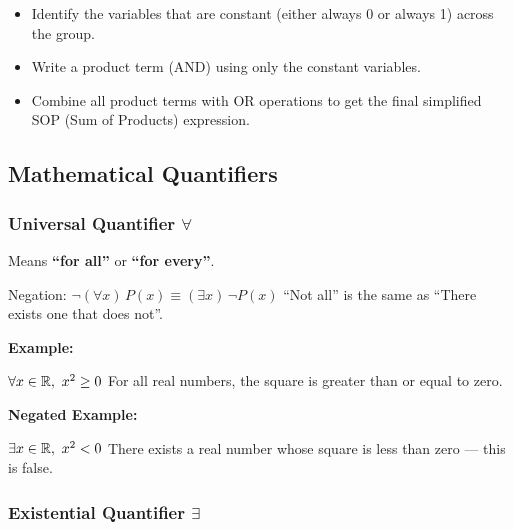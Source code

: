 \begin{enumerate}
		  \begin{itemize}

			\item Identify the variables that are constant (either always 0 or always 1) across the group.

			\item Write a product term (AND) using only the constant variables.

			\item Combine all product terms with OR operations to get the final simplified SOP (Sum of 
				  Products) expression.

		\end{itemize}

	\end{enumerate}

\subsection{Mathematical Quantifiers}

\subsubsection{Universal Quantifier \texorpdfstring{\(\forall\)}{}}  

Means \textbf{``for all''} or \textbf{``for every''}.
\vspace{\baselineskip}
		
\emph{}{Negation:} \(\neg (\forall x)\,P(x) \equiv (\exists x)\, \neg P(x)\) ``Not all'' is the same as 
``There exists one that does not''.
\vspace{\baselineskip}

\textbf{Example:} 
\vspace{\baselineskip}

\(\forall x \in \mathbb{R},\ x^2 \geq 0\) For all real numbers, the square is greater than or equal to zero.
\vspace{\baselineskip}
	
\textbf{Negated Example:} 
\vspace{\baselineskip}

\(\exists x \in \mathbb{R},\ x^2 < 0\) There exists a real number whose square is less than zero — this is 
false.
		

\subsubsection{Existential Quantifier \texorpdfstring{\(\exists\)}{}}  
	
